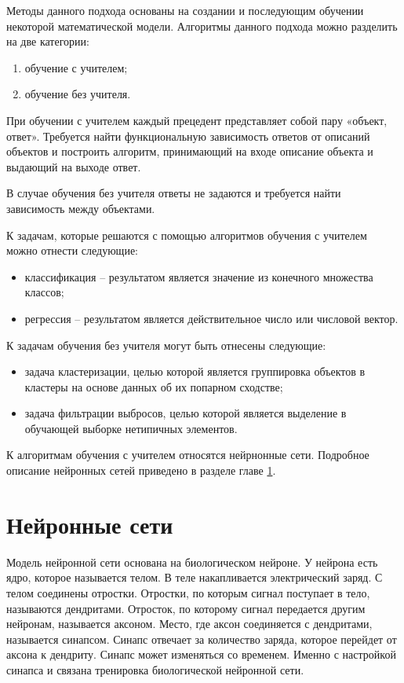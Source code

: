 Методы данного подхода основаны на создании и последующим обучении некоторой математической модели. Алгоритмы данного подхода можно разделить на две категории:
\begin{enumerate}
	\item обучение с учителем;
	\item обучение без учителя.
\end{enumerate}

При обучении с учителем каждый прецедент представляет собой пару «объект, ответ». Требуется найти функциональную зависимость ответов от описаний объектов и построить алгоритм, принимающий на входе описание объекта и выдающий на выходе ответ.

В случае обучения без учителя ответы не задаются и требуется найти зависимость между объектами.

К задачам, которые решаются с помощью алгоритмов обучения с учителем можно отнести следующие:
\begin{itemize}
	\item классификация -- результатом является значение из конечного множества классов;
	\item регрессия -- результатом является действительное число или числовой вектор.
\end{itemize}

К задачам обучения без учителя могут быть отнесены следующие:
\begin{itemize}
	\item задача кластеризации, целью которой является группировка объектов в кластеры на основе данных об их попарном сходстве;
	\item задача фильтрации выбросов, целью которой является выделение в обучающей выборке нетипичных элементов.
\end{itemize}

К алгоритмам обучения с учителем относятся нейрнонные сети. Подробное описание нейронных сетей приведено в разделе главе \ref{sec:neuro_net}.

\section{Нейронные сети}\label{sec:neuro_net}
Модель нейронной сети основана на биологическом нейроне. У нейрона есть ядро, которое называется телом. В теле накапливается электрический заряд. С телом соединены отростки. Отростки, по которым сигнал поступает в тело, называются дендритами. Отросток, по которому сигнал передается другим нейронам, называется аксоном. Место, где аксон соединяется с дендритами, называется синапсом. Синапс отвечает за количество заряда, которое перейдет от аксона к дендриту. Синапс может изменяться со временем. Именно с настройкой синапса и связана тренировка биологической нейронной сети.

